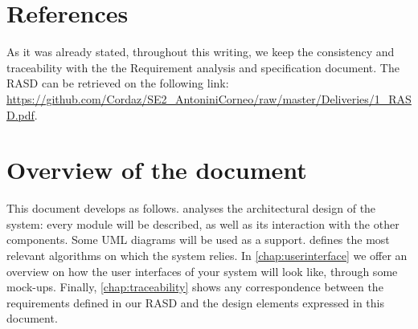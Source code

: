 \section{References}
As it was already stated, throughout this writing, we keep the consistency and traceability with the the Requirement analysis and specification document. The RASD can be retrieved on the following link: \url{https://github.com/Cordaz/SE2_AntoniniCorneo/raw/master/Deliveries/1_RASD.pdf}.


\section{Overview of the document}	
This document develops as follows.  analyses the architectural design of the system: every module will be described, as well as its interaction with the other components. Some UML diagrams will be used as a support.  defines the most relevant algorithms on which the system relies. In \cref{chap:userinterface} we offer an overview on how the user interfaces of your system will look like, through some mock-ups. Finally, \cref{chap:traceability} shows any correspondence between the requirements defined in our RASD and the design elements expressed in this document. %


